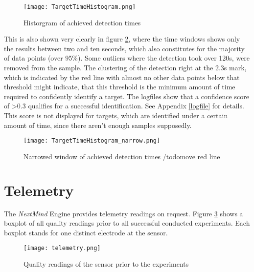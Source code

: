             \begin{figure}[h]     %
                \centering
                \texttt{[image: TargetTimeHistogram.png]} 
                \caption{Historgram of achieved detection times}\label{time-hist}
            \end{figure}    
            
            This is also shown very clearly in figure \ref*{time-hist-narrow}, where the time windows shows only the results between two and ten seconds, which also constitutes for the majority of data points (over 95\%). Some outliers where the detection took over 120s, were removed from the sample. The clustering of the detection right at the 2.3s mark, which is indicated by the red line with almost no other data points below that threshold might indicate, that this threshold is the minimum amount of time required to confidently identify a target. The logfiles show that a confidence score of >0.3 qualifies for a successful identification. See Appendix \ref*{logfile} for details. This score is not displayed for targets, which are identified under a certain amount of time, since there aren't enough samples supposedly.

            \begin{figure}[h]     %
                \centering
                \texttt{[image: TargetTimeHistogram\_narrow.png]} 
                \caption{Narrowed window of achieved detection times /todo{move red line}}\label{time-hist-narrow}
            \end{figure} 

        \section{Telemetry}

            The \textit{NextMind} Engine provides telemetry readings on request. Figure \ref*{telemetry} shows a boxplot of all quality readings prior to all successful conducted experiments. Each boxplot stands for one distinct electrode at the sensor.

            \begin{figure}[h]     %
                \centering
                \texttt{[image: telemetry.png]} 
                \caption{Quality readings of the sensor prior to the experiments}\label{telemetry}
            \end{figure} 
            

